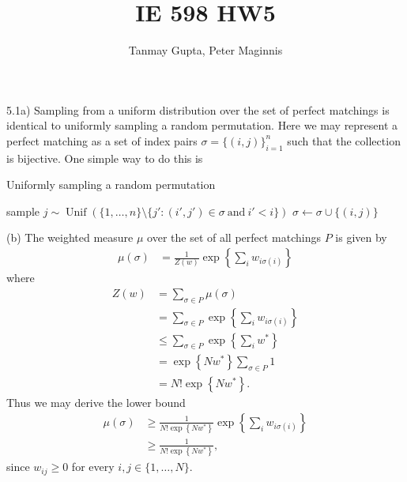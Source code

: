 \documentclass[10pt,onecolumn,letterpaper]{article}
\begin{document}
\title{IE 598 HW5}
\author{Tanmay Gupta, Peter Maginnis}
\maketitle

5.1a) Sampling from a uniform distribution over the set of perfect matchings is identical to uniformly sampling a random permutation.  Here we may represent a perfect matching as a set of index pairs $\sigma=\{(i,j)\}_{i=1}^n$ such that the collection is bijective.  One simple way to do this is
%
%
\begin{algorithm}
\raggedright
  \caption{Uniformly sampling a random permutation}
  \begin{algorithmic}
    \STATE sample $j\sim\operatorname{Unif}\left(\{1,\dotsc, n\}\setminus\{j':(i',j')\in\sigma\ \mathrm{ and }\ i'<i\}\right)$
    \STATE $\sigma\gets\sigma\cup\{(i,j)\}$
     \ENDFOR
  \end{algorithmic}
\end{algorithm}

(b) The weighted measure $\mu$ over the set of all perfect matchings $P$ is given by 
\begin{align*}
   \mu(\sigma)&=\frac{1}{Z(w)}\exp\left\{\sum_i w_{i\sigma(i)}\right\}%
\end{align*}
where
\begin{align*}
  Z(w)&=\sum_{\sigma\in P}\mu(\sigma)\\
  &=\sum_{\sigma\in P}\exp\left\{\sum_i w_{i\sigma(i)}\right\}\\
  &\leq\sum_{\sigma\in P}\exp\left\{\sum_i w^*\right\}\\
  &=\exp\left\{Nw^*\right\}\sum_{\sigma\in P}1\\
  &=N!\exp\left\{Nw^*\right\}.
\end{align*}
Thus we may derive the lower bound
\begin{align*}
   \mu(\sigma)&\geq\frac{1}{N!\exp\left\{Nw^*\right\}}\exp\left\{\sum_i w_{i\sigma(i)}\right\}\\
   &\geq\frac{1}{N!\exp\left\{Nw^*\right\}},
\end{align*}
since $w_{ij}\geq0$ for every $i,j\in\{1,\dotsc,N\}$.
\end{document}
